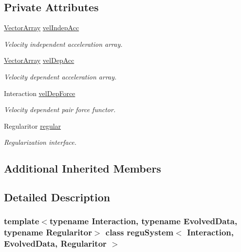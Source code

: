 \subsection*{Private Attributes}
\begin{DoxyCompactItemize}
\item 
\mbox{\hyperlink{classregu_system_aa4ecefb5c437230b994171e231450be8}{Vector\+Array}} \mbox{\hyperlink{classregu_system_afafcbf5f0c994cfe62d9fb8fb51023ab}{vel\+Indep\+Acc}}
\begin{DoxyCompactList}\small\item\em Velocity independent acceleration array. \end{DoxyCompactList}\item 
\mbox{\hyperlink{classregu_system_aa4ecefb5c437230b994171e231450be8}{Vector\+Array}} \mbox{\hyperlink{classregu_system_a3ea004b24ff22b8cc2f79f48e96dfad3}{vel\+Dep\+Acc}}
\begin{DoxyCompactList}\small\item\em Velocity dependent acceleration array. \end{DoxyCompactList}\item 
Interaction \mbox{\hyperlink{classregu_system_a9361c6c64c946570d6a71e3ab6ba74a0}{vel\+Dep\+Force}}
\begin{DoxyCompactList}\small\item\em Velocity dependent pair force functor. \end{DoxyCompactList}\item 
Regularitor \mbox{\hyperlink{classregu_system_a0009f79e1dbc7668e2cac4bc90332353}{regular}}
\begin{DoxyCompactList}\small\item\em Regularization interface. \end{DoxyCompactList}\end{DoxyCompactItemize}
\subsection*{Additional Inherited Members}


\subsection{Detailed Description}
\subsubsection*{template$<$typename Interaction, typename Evolved\+Data, typename Regularitor$>$\newline
class regu\+System$<$ Interaction, Evolved\+Data, Regularitor $>$}

